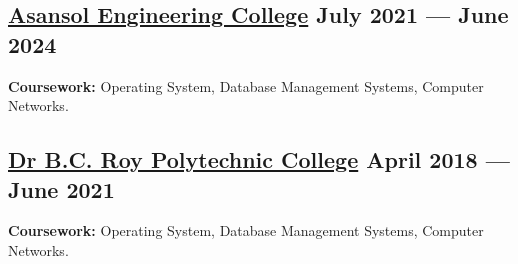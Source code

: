 {\color{black}
\subsection{{\href{https://www.aecwb.edu.in}{Asansol Engineering College} \hfill July 2021 --- June 2024}}

\vspace{0.25em}
\subtext{}\textbf{Coursework:} Operating System, Database Management Systems, Computer Networks.
\vspace{0.2em}
}

{\color{black}
\subsection{{\href{https://bcrp.ac.in/}{Dr B.C. Roy Polytechnic College} \hfill April 2018 --- June 2021}}

\vspace{0.25em}
\subtext{}\textbf{Coursework:} Operating System, Database Management Systems, Computer Networks.
\vspace{0.2em}
}
